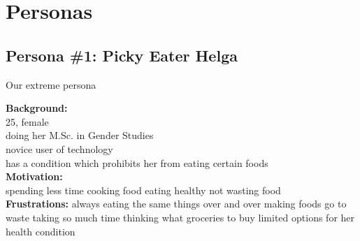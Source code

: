 \documentclass[a4paper,10pt,oneside]{scrreprt}
\begin{document}
	
	\section{Personas}
	
		\subsection{Persona \#1: Picky Eater Helga}
		
		Our extreme persona
		
		\begin{mdframed}
			\begin{minipage}{\textwidth}
				\begin{figure}
					\centering
					\vspace{-4cm}
				\end{figure}
				
				
				\textbf{Background:}\\
				25, female\\
				doing her M.Sc. in Gender Studies\\
				novice user of technology\\
				has a condition which prohibits her from eating certain foods\\
				
				
				\textbf{Motivation:}\\
				spending less time cooking food
				eating healthy
				not wasting food\\
				
				
				\textbf{Frustrations:}
				always eating the same things over and over
				making foods go to waste
				taking so much time thinking what groceries to buy
				limited options for her health condition	\\
				

\end{minipage}
\end{mdframed}
\end{document}
